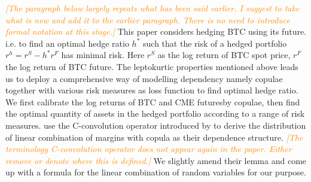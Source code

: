 \documentclass[11pt,a4paper,english]{article}
\providecommand{\natp}[1]{\textcolor{darkorange}{#1}}
\begin{document}
\natp{\em [The paragraph below largely repeats what has been said
  earlier. I suggest to take what is new and add it to the earlier
  paragraph. There is no need to introduce formal notation at this stage.]}
This paper considers hedging BTC using its future. %
i.e. to find an optimal hedge ratio $h^*$ such that the risk of a hedged portfolio $r^h = r^S - h^*r^F$ has
minimal risk.
Here $r^S$ as the log return of BTC spot price, $r^F$ the log return of BTC future.
The leptokurtic properties mentioned above leads us to deploy a comprehensive way of modelling dependency namely copulae together with various risk measures as loss function to find optimal hedge ratio.
We first calibrate the log returns of BTC and CME futuresby copulae,
then find the optimal quantity of assets in the hedged portfolio according to a range of risk measures.
\citet{barbi2014copula} use the C-convolution operator introduced by \citet{cherubini2011copula} to derive the distribution
of linear combination of margins with copula as their dependence
structure. \natp{\em [The terminology C-convolution operator does not
  appear again in the paper. Either remove or denote where this is defined.]}
We slightly amend their lemma and come up with a formula for the linear combination of random variables for our purpose.\medskip
%
%
\end{document}
